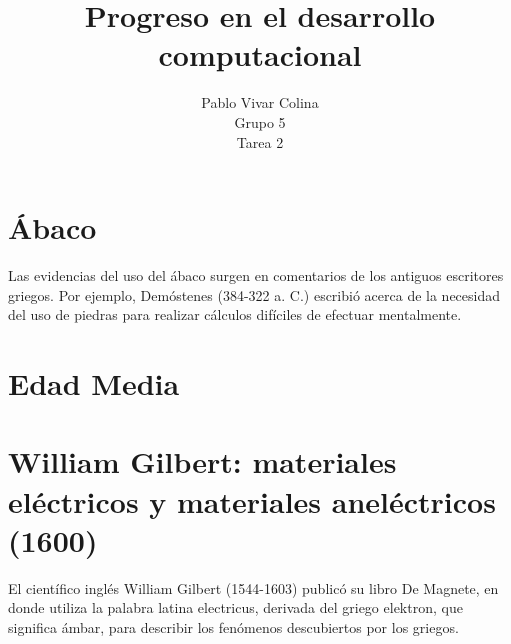\documentclass{article}
\title{Progreso en el desarrollo computacional}
\author{Pablo Vivar Colina\\
Grupo 5\\
Tarea 2
}
\begin{document}
\maketitle

\section{Ábaco}

Las evidencias del uso del ábaco surgen en comentarios de los antiguos escritores griegos. Por ejemplo, Demóstenes (384-322 a. C.) escribió acerca de la necesidad del uso de piedras para realizar cálculos difíciles de efectuar mentalmente. \citep{Abaco}\\


\section{Edad Media}





\section{William Gilbert: materiales eléctricos y materiales aneléctricos (1600)}

El científico inglés William Gilbert (1544-1603) publicó su libro De Magnete, en donde utiliza la palabra latina electricus, derivada del griego elektron, que significa ámbar, para describir los fenómenos descubiertos por los griegos. \citep{HDE}\\

\end{document}

